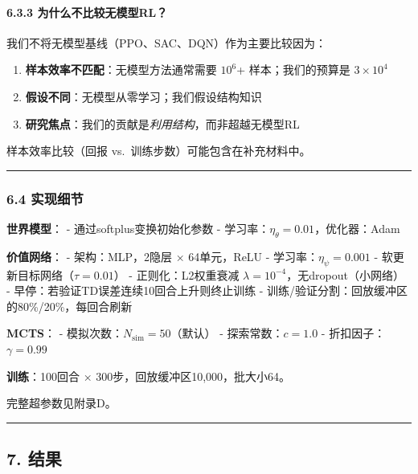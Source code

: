\documentclass[UTF8]{ctexart}
\providecommand{\tightlist}{%
  \setlength{\itemsep}{0pt}\setlength{\parskip}{0pt}}
\let\oldparagraph\paragraph
\renewcommand{\paragraph}[1]{\oldparagraph{#1}\mbox{}}
\begin{document}
\hypertarget{ux4e3aux4ec0ux4e48ux4e0dux6bd4ux8f83ux65e0ux6a21ux578brl}{%
\paragraph{6.3.3
为什么不比较无模型RL？}\label{ux4e3aux4ec0ux4e48ux4e0dux6bd4ux8f83ux65e0ux6a21ux578brl}}

我们不将无模型基线（PPO、SAC、DQN）作为主要比较因为：

\begin{enumerate}
\def\labelenumi{\arabic{enumi}.}
\tightlist
\item
  \textbf{样本效率不匹配}：无模型方法通常需要 \(10^6\)+
  样本；我们的预算是 \(3 \times 10^4\)
\item
  \textbf{假设不同}：无模型从零学习；我们假设结构知识
\item
  \textbf{研究焦点}：我们的贡献是\emph{利用结构}，而非超越无模型RL
\end{enumerate}

样本效率比较（回报 vs.~训练步数）可能包含在补充材料中。

\begin{center}\rule{0.5\linewidth}{0.4pt}\end{center}

\hypertarget{ux5b9eux73b0ux7ec6ux8282}{%
\subsubsection{6.4 实现细节}\label{ux5b9eux73b0ux7ec6ux8282}}

\textbf{世界模型}： - 通过softplus变换初始化参数 -
学习率：\(\eta_\theta = 0.01\)，优化器：Adam

\textbf{价值网络}： - 架构：MLP，2隐层 × 64单元，ReLU -
学习率：\(\eta_\psi = 0.001\) - 软更新目标网络（\(\tau = 0.01\)） -
正则化：L2权重衰减 \(\lambda = 10^{-4}\)，无dropout（小网络） -
早停：若验证TD误差连续10回合上升则终止训练 -
训练/验证分割：回放缓冲区的80\%/20\%，每回合刷新

\textbf{MCTS}： - 模拟次数：\(N_{\text{sim}} = 50\)（默认） -
探索常数：\(c = 1.0\) - 折扣因子：\(\gamma = 0.99\)

\textbf{训练}：100回合 × 300步，回放缓冲区10,000，批大小64。

完整超参数见附录D。

\begin{center}\rule{0.5\linewidth}{0.4pt}\end{center}

\hypertarget{ux7ed3ux679c}{%
\subsection{7. 结果}\label{ux7ed3ux679c}}
\end{document}
